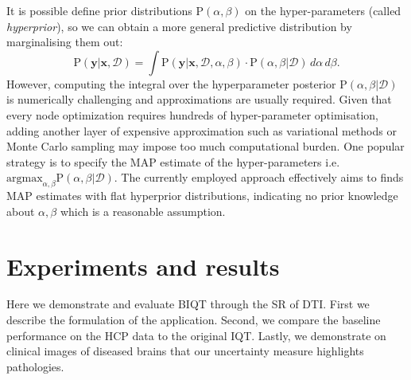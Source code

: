 	 It is possible define prior distributions $\text{P}(\alpha,\beta)$ on the hyper-parameters (called \textit{hyperprior}), so we can obtain a more general predictive distribution by marginalising them out:
		\begin{equation*}
	\text{P}(\mathbf{y}|\mathbf{x}, \mathcal{D}) 
	= \int \text{P}(\mathbf{y}|\mathbf{x}, \mathcal{D}, \alpha,\beta) \cdot \text{P}(\alpha,\beta|\mathcal{D}) \,d\alpha \,d\beta .
	\end{equation*}
	 However, computing the integral over the hyperparameter posterior $\text{P}(\alpha,\beta|\mathcal{D})$ is numerically challenging and approximations are usually required. Given that every node optimization requires hundreds of hyper-parameter optimisation, adding another layer of expensive approximation such  as variational methods or Monte Carlo sampling may impose too much computational burden. One popular strategy is to specify the MAP estimate of the hyper-parameters i.e. $\text{argmax}_{\alpha,\beta}\text{P}(\alpha,\beta|\mathcal{D})$. The currently employed approach effectively aims to finds MAP estimates with flat hyperprior distributions, indicating no prior knowledge about $\alpha, \beta$ which is a reasonable assumption. 
	
	\section{Experiments and results}
	Here we demonstrate and evaluate BIQT through the SR of DTI. First we describe the formulation of the application. Second, we compare the baseline performance on the HCP data to the original IQT. Lastly, we demonstrate on clinical images of diseased brains that our uncertainty measure highlights pathologies.
	
